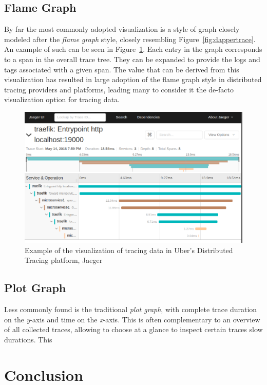 \documentclass[pdftex,titlepage]{article}
\begin{document}
        \subsection{Flame Graph}
        By far the most commonly adopted visualization 
        is a style of graph closely modeled after the \textit{flame graph} style, closely resembling Figure~\ref{fig:dappertrace}. An example 
        of such can be seen in Figure~\ref{fig:jaeger}. Each entry in the graph corresponds to a span in the overall trace tree. They can be
        expanded to provide the logs and tags associated with a given span. The value that can be derived from this visualization has resulted
        in large adoption of the flame graph style in distributed tracing providers and platforms, leading many to consider it the de-facto 
        visualization option for tracing data.

        \begin{figure}[htb!]
            \centering
            \includegraphics[scale=0.35]{jaeger}
            \caption{Example of the visualization of tracing data in Uber's Distributed Tracing platform, Jaeger}
            \label{fig:jaeger}
        \end{figure}

        \subsection{Plot Graph}
        Less commonly found is the traditional \textit{plot graph}, with complete trace duration on the \textit{y}-axis and time on the \textit{x}-axis.
        This is often complementary to an overview of all collected traces, allowing to choose at a glance to inspect certain traces slow durations.
        This 

    \section{Conclusion}
    
\end{document}

